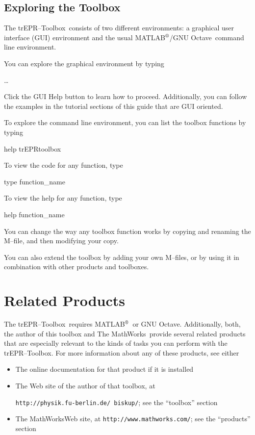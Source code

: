 \documentclass[a4paper]{refrep}
\newcommand{\matlab}{\textsf{MATLAB$^{\mbox{\scriptsize\textregistered}}$}}
\newcommand{\mathworks}{\textsf{The MathWorks}}
\newcommand{\octave}{\textsf{GNU Octave}}
\newcommand{\trEPRtb}{\textsf{trEPR--Toolbox}}
\begin{document}
\subsection{Exploring the Toolbox}

The \trEPRtb\ consists of two different environments: a graphical user interface
(GUI) environment and the usual \matlab/\octave\ command line environment.

You can explore the graphical environment by typing

\begin{example}
\ldots 
\end{example}

Click the GUI Help button to learn how to proceed. Additionally, you can follow
the examples in the tutorial sections of this guide that are GUI oriented.

To explore the command line environment, you can list the toolbox functions by
typing 

\begin{example} 
  help trEPRtoolbox
\end{example}

To view the code for any function, type

\begin{example}
  type function\_name 
\end{example}

To view the help for any function, type

\begin{example}
  help function\_name 
\end{example}

You can change the way any toolbox function works by copying and renaming the
M--file, and then modifying your copy.

You can also extend the toolbox by adding your own M--files, or by using it in
combination with other products and toolboxes.


\section{Related Products}

The \trEPRtb\ requires \matlab\ or \octave. Additionally, both, the author of
this toolbox and \mathworks\ provide several related products that are
especially relevant to the kinds of tasks you can perform with the \trEPRtb. For
more information about any of these products, see either

\begin{itemize}
  \item The online documentation for that product if it is installed
  \item The Web site of the author of that toolbox, at
  
  \texttt{http://physik.fu-berlin.de/~biskup/}; see the ``toolbox'' section
  \item \mathworks Web site, at \texttt{http://www.mathworks.com/}; see the
  ``products'' section
\end{itemize}
\end{document}
